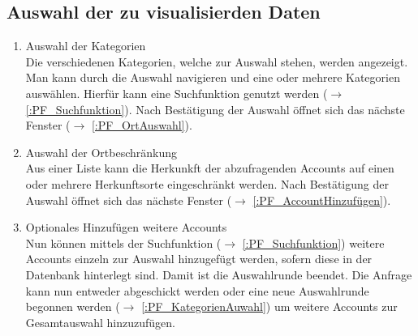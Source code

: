 \subsection{Auswahl der zu visualisierden Daten}
\begin{enumerate}[ align=left, label={\textbf{\textbackslash F10\arabic*0\textbackslash}} ]
	\item Auswahl der Kategorien \label{:PF_KategorienAuswahl}\\ 
	Die verschiedenen Kategorien, welche zur Auswahl stehen, werden angezeigt. Man kann durch die Auswahl navigieren und eine oder mehrere Kategorien auswählen. Hierfür kann eine Suchfunktion genutzt werden ($\rightarrow$ \ref{:PF_Suchfunktion}).  Nach Bestätigung der Auswahl öffnet sich das nächste Fenster ($\rightarrow$ \ref{:PF_OrtAuswahl}).
	\item Auswahl der Ortbeschränkung \label{:PF_OrtAuswahl} \\
	Aus einer Liste kann die Herkunkft der abzufragenden Accounts auf einen oder mehrere Herkunftsorte eingeschränkt werden. Nach Bestätigung der Auswahl öffnet sich das nächste Fenster ($\rightarrow$ \ref{:PF_AccountHinzufügen}).
	\item Optionales Hinzufügen weitere Accounts \label{:PF_AccountHinzufügen} \\
	Nun können mittels der Suchfunktion ($\rightarrow$ \ref{:PF_Suchfunktion}) weitere Accounts einzeln zur Auswahl hinzugefügt werden, sofern diese in der Datenbank hinterlegt sind. Damit ist die Auswahlrunde beendet. Die Anfrage kann nun entweder abgeschickt werden oder eine neue Auswahlrunde begonnen werden ($\rightarrow$ \ref{:PF_KategorienAuwahl}) um weitere Accounts zur Gesamtauswahl hinzuzufügen.
\end{enumerate}	
